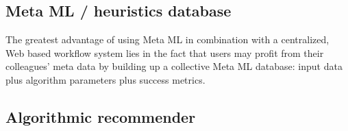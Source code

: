 \subsection{Meta ML / heuristics database}
\label{ssect:heuristics}

The greatest advantage of using Meta ML in combination with a centralized, Web based workflow system lies in the fact that users may profit from their colleagues' meta data by building up a collective Meta ML database: input data plus algorithm parameters plus success metrics.


\subsection{Algorithmic recommender}
\label{ssect:algo_recommender}
